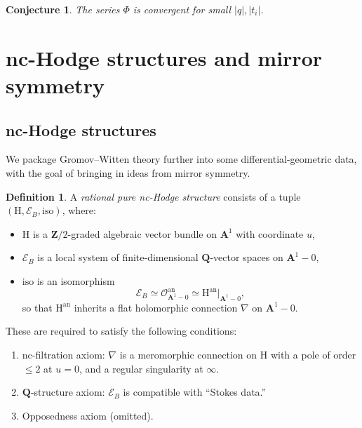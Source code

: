\documentclass[11pt, reqno]{amsart}
\numberwithin{equation}{section}
\theoremstyle{plain}
\newtheorem{conjecture}[theorem]{Conjecture}
\theoremstyle{definition}
\newtheorem{definition}[theorem]{Definition}
\theoremstyle{italicsname}
\newcommand{\an}{\mathrm{an}}
\newcommand{\cO}{\mathcal{O}}
\newcommand{\cE}{\mathcal{E}}
\newcommand{\rH}{\mathrm{H}}
\newcommand{\bA}{\mathbf{A}}
\newcommand{\bZ}{\mathbf{Z}}
\newcommand{\bQ}{\mathbf{Q}}
\begin{document}
\begin{conjecture}
\label{conj:convergence}
    The series $\Phi$ is convergent for small $|q|, |t_i|$.
\end{conjecture}




\section{nc-Hodge structures and mirror symmetry} %
\label{sec:nc_hodge_structures_and_mirror_symmetry}

\subsection*{nc-Hodge structures} We package Gromov--Witten theory further into some differential-geometric data, with the goal of bringing in ideas from mirror symmetry. 

\begin{definition}
\label{def:nc_hodge}
    A \emph{rational pure nc-Hodge structure} consists of a tuple $(\rH, \cE_B, \mathrm{iso})$, where:
    \begin{itemize}
        \item $\rH$ is a $\bZ/2$-graded algebraic vector bundle on $\bA^1$ with coordinate $u$,
        \item $\cE_B$ is a local system of finite-dimensional $\bQ$-vector spaces on $\bA^1 - 0$,
        \item $\mathrm{iso}$ is an isomorphism
        \[
            \cE_B \simeq \cO_{\bA^1 - 0}^{\an} \simeq \rH^{\an}|_{\bA^1 - 0},
        \]
        so that $\rH^{\an}$ inherits a flat holomorphic connection $\nabla$ on $\bA^1 - 0$.
    \end{itemize}
    These are required to satisfy the following conditions:
    \begin{enumerate} [label = (\arabic*)]
        \item nc-filtration axiom: $\nabla$ is a meromorphic connection on $\rH$ with a pole of order $\leq 2$ at $ u = 0$, and a regular singularity at $\infty$.
        \item $\bQ$-structure axiom: $\cE_B$ is compatible with ``Stokes data.'' 
        \item Opposedness axiom (omitted).
    \end{enumerate}
\end{definition}
\end{document}
